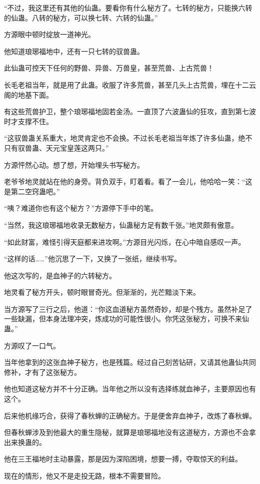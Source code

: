 \begin{this_body}
“不过，我这里还有其他的仙蛊。要看你有什么秘方了。七转的秘方，只能换六转的仙蛊。八转的秘方，可以换七转、六转的仙蛊。”

方源眼中顿时绽放一道神光。

他知道琅琊福地中，还有一只七转的驭兽蛊。

此仙蛊可控天下任何的野兽、异兽、万兽皇，甚至荒兽、上古荒兽！

长毛老祖当年，就是用了此蛊。收服了许多荒兽，甚至几头上古荒兽，埋在十二云阁的地基下面。

有这些荒兽护卫，整个琅琊福地固若金汤。一直顶了六波蛊仙的狂攻，直到第七波时才支撑不住。

“这驭兽蛊关系重大，地灵肯定也不会换。不过长毛老祖当年炼了许多仙蛊，绝不只有驭兽蛊、天元宝皇莲这两只。”

方源怦然心动。想了想，开始埋头书写秘方。

老爷爷地灵就站在他的身旁。背负双手，盯着看。看了一会儿，他哈哈一笑：“这是第二空窍蛊吧。”

“咦？难道你也有这个秘方？”方源停下手中的笔。

“当然，我这琅琊福地收录无数秘方，仙蛊秘方足有数千张。”地灵颇有傲意。

“如此财富，难怪引得天庭都来进攻啊。”方源目光闪烁，在心中暗自感叹一声。

“这样的话……”他沉思了一下，又换了一张纸，继续书写。

他这次写的，是血神子的六转秘方。

地灵看了秘方开头，顿时眼冒奇光。但渐渐的，光芒黯淡下来。

当方源写了三行之后，他道：“你这血道秘方虽然奇妙，却是个残方。虽然补足了一些缺漏，但本身法理冲突，炼成功的可能性很小。你凭这张秘方，可换不来仙蛊。”

方源叹了一口气。

当年他拿到的这张血神子秘方，也是残篇。经过自己刻苦钻研，又请其他蛊仙共同修补，才有了这张秘方。

他也知道这秘方并不十分正确。当年他之所以没有选择练就血神子，主要原因也有这个。

后来他机缘巧合，获得了春秋蝉的正确秘方。于是便舍弃血神子，改炼了春秋蝉。

但春秋蝉涉及到他最大的重生隐秘，就算是琅琊福地没有这道秘方，方源也不会拿出来换蛊的。

他在三王福地时主动暴露，那是因为深陷困境，想要一搏，夺取惊天的利益。

现在的情形，他又不是走投无路，根本不需要冒险。


\end{this_body}
